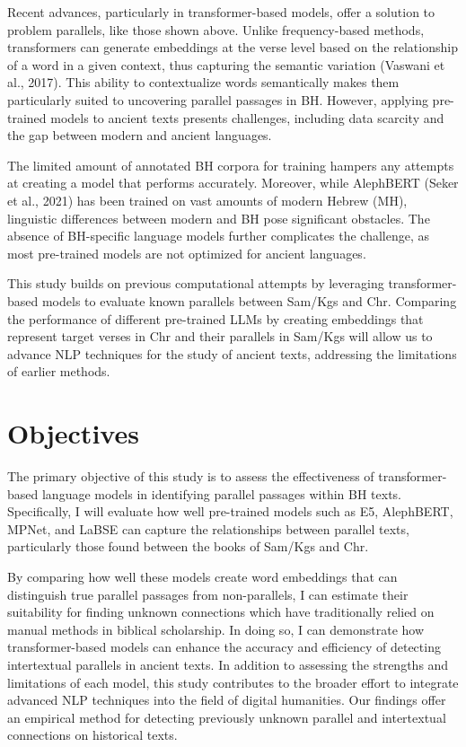 \documentclass[12pt]{article}
\begin{document}
Recent advances, particularly in transformer-based models, offer a solution to problem parallels, like those shown above. Unlike frequency-based methods, transformers can generate embeddings at the verse level based on the relationship of a word in a given context, thus capturing the semantic variation (Vaswani et al., 2017). This ability to contextualize words semantically makes them particularly suited to uncovering parallel passages in BH. However, applying pre-trained models to ancient texts presents challenges, including data scarcity and the gap between modern and ancient languages.

The limited amount of annotated BH corpora for training hampers any attempts at creating a model that performs accurately. Moreover, while AlephBERT (Seker et al., 2021) has been trained on vast amounts of modern Hebrew (MH), linguistic differences between modern and BH pose significant obstacles. The absence of BH-specific language models further complicates the challenge, as most pre-trained models are not optimized for ancient languages.

This study builds on previous computational attempts by leveraging transformer-based models to evaluate known parallels between Sam/Kgs and Chr. Comparing the performance of different pre-trained LLMs by creating embeddings that represent target verses in Chr and their parallels in Sam/Kgs will allow us to advance NLP techniques for the study of ancient texts, addressing the limitations of earlier methods.

\section{Objectives}
The primary objective of this study is to assess the effectiveness of transformer-based language models in identifying parallel passages within BH texts. Specifically, I will evaluate how well pre-trained models such as E5, AlephBERT, MPNet, and LaBSE can capture the relationships between parallel texts, particularly those found between the books of Sam/Kgs and Chr.

By comparing how well these models create word embeddings that can distinguish true parallel passages from non-parallels, I can estimate their suitability for finding unknown connections which have traditionally relied on manual methods in biblical scholarship. In doing so, I can demonstrate how transformer-based models can enhance the accuracy and efficiency of detecting intertextual parallels in ancient texts. In addition to assessing the strengths and limitations of each model, this study contributes to the broader effort to integrate advanced NLP techniques into the field of digital humanities. Our findings offer an empirical method for detecting previously unknown parallel and intertextual connections on historical texts.
\end{document}
